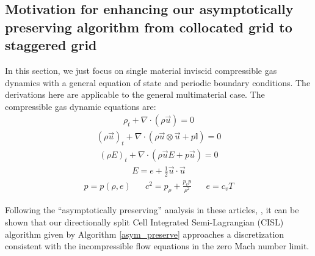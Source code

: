 \documentclass[]{article}
\newcommand{\EyeTen}{\mathbb{I}}
\begin{document}
\subsection{Motivation for enhancing our asymptotically preserving
  algorithm from collocated grid to staggered grid }

In this section, we just focus on single material inviscid
compressible gas dynamics
with a general equation of state and periodic boundary conditions.  
The derivations here are applicable to the
general multimaterial case.  
The compressible gas dynamic 
equations\cite{almgren2006low,boscarino2018all,scandurra2016numerical,
CHERTOCK2026119292} are:
\begin{eqnarray}
\rho_{t}+\nabla\cdot(\rho\vec{u})=0 \label{pde1}
\end{eqnarray}
\begin{eqnarray}
(\rho \vec{u})_{t}+\nabla\cdot(\rho\vec{u}\otimes\vec{u}+p\EyeTen)=0
\end{eqnarray}
\begin{eqnarray}
(\rho E)_{t}+\nabla\cdot(\rho\vec{u}E+p\vec{u})=0
\end{eqnarray}
\begin{eqnarray}
E=e+\frac{1}{2}\vec{u}\cdot\vec{u}
\end{eqnarray}
\begin{eqnarray}
p=p(\rho,e) \hspace{20pt} c^{2}=p_{\rho}+\frac{p_{e}p}{\rho^{2}} 
\hspace{20pt} e=c_{v}T \label{pde2}
\end{eqnarray}

Following the ``asymptotically preserving'' analysis in these articles,
\cite{almgren2006low,boscarino2018all,scandurra2016numerical,
CHERTOCK2026119292}, 
it can be shown that our
directionally split Cell Integrated Semi-Lagrangian (CISL) algorithm 
given by
Algorithm \ref{asym_preserve}
approaches a discretization consistent with the incompressible flow
equations in the zero Mach number limit.
\end{document}
